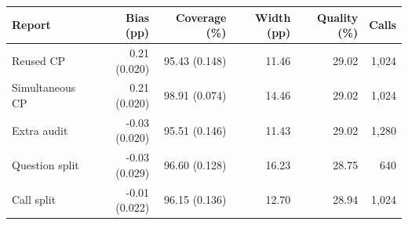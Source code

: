 \begin{tabular}{lrrrrr}
\toprule
Report & Bias (pp) & Coverage (\%) & Width (pp) & Quality (\%) & Calls \\
\midrule
Reused CP & 0.21 (0.020) & 95.43 (0.148) & 11.46 & 29.02 & 1,024 \\
Simultaneous CP & 0.21 (0.020) & 98.91 (0.074) & 14.46 & 29.02 & 1,024 \\
Extra audit & -0.03 (0.020) & 95.51 (0.146) & 11.43 & 29.02 & 1,280 \\
Question split & -0.03 (0.029) & 96.60 (0.128) & 16.23 & 28.75 & 640 \\
Call split & -0.01 (0.022) & 96.15 (0.136) & 12.70 & 28.94 & 1,024 \\
\bottomrule
\end{tabular}
